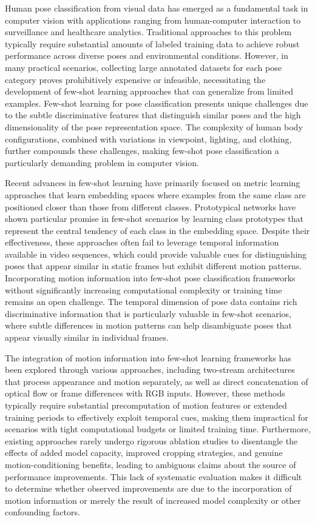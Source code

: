 \documentclass[11pt]{article}
\begin{document}
Human pose classification from visual data has emerged as a fundamental task in computer vision with applications ranging from human-computer interaction to surveillance and healthcare analytics. Traditional approaches to this problem typically require substantial amounts of labeled training data to achieve robust performance across diverse poses and environmental conditions. However, in many practical scenarios, collecting large annotated datasets for each pose category proves prohibitively expensive or infeasible, necessitating the development of few-shot learning approaches that can generalize from limited examples. Few-shot learning for pose classification presents unique challenges due to the subtle discriminative features that distinguish similar poses and the high dimensionality of the pose representation space. The complexity of human body configurations, combined with variations in viewpoint, lighting, and clothing, further compounds these challenges, making few-shot pose classification a particularly demanding problem in computer vision.

Recent advances in few-shot learning have primarily focused on metric learning approaches that learn embedding spaces where examples from the same class are positioned closer than those from different classes. Prototypical networks have shown particular promise in few-shot scenarios by learning class prototypes that represent the central tendency of each class in the embedding space. Despite their effectiveness, these approaches often fail to leverage temporal information available in video sequences, which could provide valuable cues for distinguishing poses that appear similar in static frames but exhibit different motion patterns. Incorporating motion information into few-shot pose classification frameworks without significantly increasing computational complexity or training time remains an open challenge. The temporal dimension of pose data contains rich discriminative information that is particularly valuable in few-shot scenarios, where subtle differences in motion patterns can help disambiguate poses that appear visually similar in individual frames.

The integration of motion information into few-shot learning frameworks has been explored through various approaches, including two-stream architectures that process appearance and motion separately, as well as direct concatenation of optical flow or frame differences with RGB inputs. However, these methods typically require substantial precomputation of motion features or extended training periods to effectively exploit temporal cues, making them impractical for scenarios with tight computational budgets or limited training time. Furthermore, existing approaches rarely undergo rigorous ablation studies to disentangle the effects of added model capacity, improved cropping strategies, and genuine motion-conditioning benefits, leading to ambiguous claims about the source of performance improvements. This lack of systematic evaluation makes it difficult to determine whether observed improvements are due to the incorporation of motion information or merely the result of increased model complexity or other confounding factors.
\end{document}
